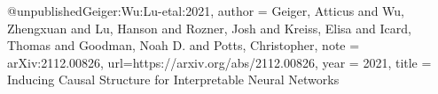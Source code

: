 @unpublished{Geiger:Wu:Lu-etal:2021,
    author = {Geiger, Atticus and Wu, Zhengxuan and Lu, Hanson and Rozner, Josh and Kreiss, Elisa and Icard, Thomas and Goodman, Noah D. and Potts, Christopher},
    note = {arXiv:2112.00826},
    url={https://arxiv.org/abs/2112.00826},
    year = {2021},
    title = {Inducing Causal Structure for Interpretable Neural Networks}}
